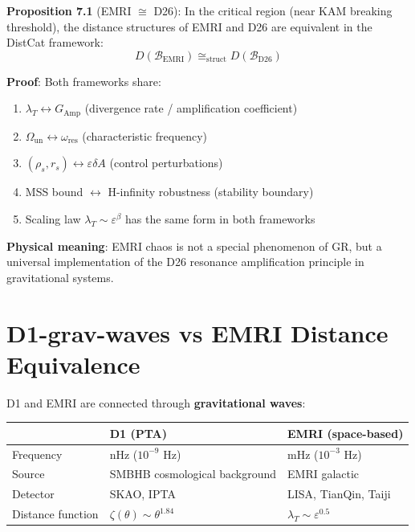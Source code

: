 \documentclass[12pt]{article}
\begin{document}
\textbf{Proposition 7.1} (EMRI $\cong$ D26): In the critical region (near KAM breaking threshold), the distance structures of EMRI and D26 are equivalent in the DistCat framework:
\begin{equation}
D(\mathcal{B}_{\text{EMRI}}) \cong_{\text{struct}} D(\mathcal{B}_{\text{D26}})
\end{equation}

\textbf{Proof}: Both frameworks share:
\begin{enumerate}
\item $\lambda_T \leftrightarrow G_{\text{Amp}}$ (divergence rate / amplification coefficient)
\item $\Omega_{\text{un}} \leftrightarrow \omega_{\text{res}}$ (characteristic frequency)
\item $(\rho_s, r_s) \leftrightarrow \varepsilon\delta A$ (control perturbations)
\item MSS bound $\leftrightarrow$ H-infinity robustness (stability boundary)
\item Scaling law $\lambda_T \sim \varepsilon^\beta$ has the same form in both frameworks
\end{enumerate}

\textbf{Physical meaning}: EMRI chaos is not a special phenomenon of GR, but a universal implementation of the D26 resonance amplification principle in gravitational systems.

\section{D1-grav-waves vs EMRI Distance Equivalence}

D1 and EMRI are connected through \textbf{gravitational waves}:

\begin{table}[H]
\centering
\begin{tabular}{l l l}
\toprule
\textbf{} & \textbf{D1 (PTA)} & \textbf{EMRI (space-based)} \\
\midrule
Frequency & nHz ($10^{-9}$ Hz) & mHz ($10^{-3}$ Hz) \\
Source & SMBHB cosmological background & EMRI galactic \\
Detector & SKAO, IPTA & LISA, TianQin, Taiji \\
Distance function & $\zeta(\theta) \sim \theta^{1.84}$ & $\lambda_T \sim \varepsilon^{0.5}$ \\
\bottomrule
\end{tabular}
\end{table}
\end{document}
